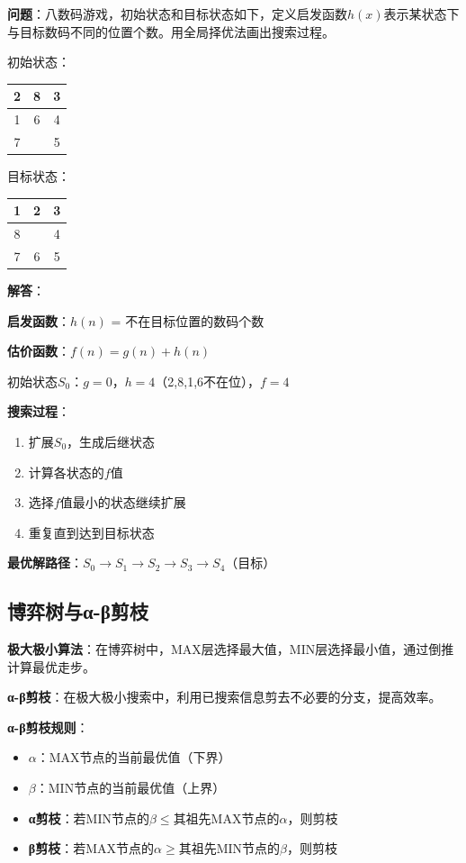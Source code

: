 \begin{examplebox}[例题4.6 八数码问题]
\textbf{问题}：八数码游戏，初始状态和目标状态如下，定义启发函数$h(x)$表示某状态下与目标数码不同的位置个数。用全局择优法画出搜索过程。

\begin{center}
初始状态：\quad
\begin{tabular}{|c|c|c|}
\hline
2 & 8 & 3 \\
\hline
1 & 6 & 4 \\
\hline
7 &   & 5 \\
\hline
\end{tabular}
\quad\quad
目标状态：\quad
\begin{tabular}{|c|c|c|}
\hline
1 & 2 & 3 \\
\hline
8 &   & 4 \\
\hline
7 & 6 & 5 \\
\hline
\end{tabular}
\end{center}
\tcblower
\textbf{解答}：

\textbf{启发函数}：$h(n)$ = 不在目标位置的数码个数

\textbf{估价函数}：$f(n) = g(n) + h(n)$

初始状态$S_0$：$g=0$，$h=4$（2,8,1,6不在位），$f=4$

\textbf{搜索过程}：
\begin{enumerate}[itemsep=0pt]
    \item 扩展$S_0$，生成后继状态
    \item 计算各状态的$f$值
    \item 选择$f$值最小的状态继续扩展
    \item 重复直到达到目标状态
\end{enumerate}

\textbf{最优解路径}：$S_0 \to S_1 \to S_2 \to S_3 \to S_4$（目标）
\end{examplebox}

\subsection{博弈树与α-β剪枝}

\begin{conceptbox}
\textbf{极大极小算法}：在博弈树中，MAX层选择最大值，MIN层选择最小值，通过倒推计算最优走步。

\textbf{α-β剪枝}：在极大极小搜索中，利用已搜索信息剪去不必要的分支，提高效率。
\end{conceptbox}

\begin{formulabox}
\textbf{α-β剪枝规则}：
\begin{itemize}[itemsep=0pt]
    \item $\alpha$：MAX节点的当前最优值（下界）
    \item $\beta$：MIN节点的当前最优值（上界）
    \item \textbf{α剪枝}：若MIN节点的$\beta \leq$其祖先MAX节点的$\alpha$，则剪枝
    \item \textbf{β剪枝}：若MAX节点的$\alpha \geq$其祖先MIN节点的$\beta$，则剪枝
\end{itemize}
\end{formulabox}

